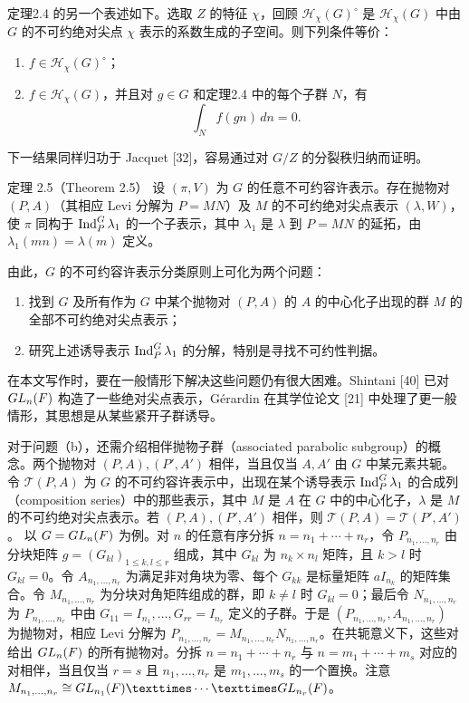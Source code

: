 定理2.4 的另一个表述如下。选取 $Z$ 的特征 $\chi$，回顾 $\mathcal H_\chi(G)^\circ$ 是 $\mathcal H_\chi(G)$ 中由 $G$ 的不可约绝对尖点 $\chi$ 表示的系数生成的子空间。则下列条件等价：
\begin{enumerate}
\item[(a)] $f\in\mathcal H_\chi(G)^\circ$；
\item[(b)] $f\in\mathcal H_\chi(G)$，并且对 $g\in G$ 和定理2.4 中的每个子群 $N$，有
\[
\int_N f(gn)\,dn=0.\tag{5}
\]
\end{enumerate}
下一结果同样归功于 Jacquet [32]，容易通过对 $G/Z$ 的分裂秩归纳而证明。
\begin{originaltheorem}{定理 2.5（Theorem 2.5）}
设 $(\pi,V)$ 为 $G$ 的任意不可约容许表示。存在抛物对 $(P,A)$（其相应 Levi 分解为 $P=MN$）及 $M$ 的不可约绝对尖点表示 $(\lambda,W)$，使 $\pi$ 同构于 $\operatorname{Ind}_P^G\lambda_1$ 的一个子表示，其中 $\lambda_1$ 是 $\lambda$ 到 $P=MN$ 的延拓，由 $\lambda_1(mn)=\lambda(m)$ 定义。
\end{originaltheorem}
由此，$G$ 的不可约容许表示分类原则上可化为两个问题：
\begin{enumerate}
\item[(a)] 找到 $G$ 及所有作为 $G$ 中某个抛物对 $(P,A)$ 的 $A$ 的中心化子出现的群 $M$ 的全部不可约绝对尖点表示；
\item[(b)] 研究上述诱导表示 $\operatorname{Ind}_P^G\lambda_1$ 的分解，特别是寻找不可约性判据。
\end{enumerate}
在本文写作时，要在一般情形下解决这些问题仍有很大困难。Shintani [40] 已对 $GL_n(F)$ 构造了一些绝对尖点表示，Gérardin 在其学位论文 [21] 中处理了更一般情形，其思想是从某些紧开子群诱导。

对于问题（b），还需介绍相伴抛物子群（associated parabolic subgroup）的概念。两个抛物对 $(P,A),(P',A')$ 相伴，当且仅当 $A,A'$ 由 $G$ 中某元素共轭。令 $\mathcal T(P,A)$ 为 $G$ 的不可约容许表示中，出现在某个诱导表示 $\operatorname{Ind}_P^G\lambda_1$ 的合成列（composition series）中的那些表示，其中 $M$ 是 $A$ 在 $G$ 中的中心化子，$\lambda$ 是 $M$ 的不可约绝对尖点表示。若 $(P,A),(P',A')$ 相伴，则 $\mathcal T(P,A)=\mathcal T(P',A')$。
以 $G=GL_n(F)$ 为例。对 $n$ 的任意有序分拆 $n=n_1+\cdots+n_r$，令 $P_{n_1,\ldots,n_r}$ 由分块矩阵 $g=(G_{kl})_{1\leq k,l\leq r}$ 组成，其中 $G_{kl}$ 为 $n_k\times n_l$ 矩阵，且 $k>l$ 时 $G_{kl}=0$。令 $A_{n_1,\ldots,n_r}$ 为满足非对角块为零、每个 $G_{kk}$ 是标量矩阵 $aI_{n_k}$ 的矩阵集合。令 $M_{n_1,\ldots,n_r}$ 为分块对角矩阵组成的群，即 $k\ne l$ 时 $G_{kl}=0$；最后令 $N_{n_1,\ldots,n_r}$ 为 $P_{n_1,\ldots,n_r}$ 中由 $G_{11}=I_{n_1},\ldots,G_{rr}=I_{n_r}$ 定义的子群。于是 $(P_{n_1,\ldots,n_r},A_{n_1,\ldots,n_r})$ 为抛物对，相应 Levi 分解为 $P_{n_1,\ldots,n_r}=M_{n_1,\ldots,n_r}N_{n_1,\ldots,n_r}$。在共轭意义下，这些对给出 $GL_n(F)$ 的所有抛物对。分拆 $n=n_1+\cdots+n_r$ 与 $n=m_1+\cdots+m_s$ 对应的对相伴，当且仅当 $r=s$ 且 $n_1,\ldots,n_r$ 是 $m_1,\ldots,m_s$ 的一个置换。注意 $M_{n_1,\ldots,n_r}\cong\GL_{n_1}(F)\times\cdots\times\GL_{n_r}(F)$。

